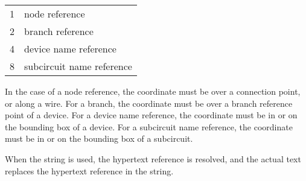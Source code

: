 \begin{description}
\begin{tabular}{ll}
1 & node reference\\
2 & branch reference\\
4 & device name reference\\
8 & subcircuit name reference\\
\end{tabular}

In the case of a node reference, the coordinate must be over a
connection point, or along a wire.  For a branch, the coordinate must
be over a branch reference point of a device.  For a device name
reference, the coordinate must be in or on the bounding box of a
device.  For a subcircuit name reference, the coordinate must be in or
on the bounding box of a subcircuit.

When the string is used, the hypertext reference is resolved, and
the actual text replaces the hypertext reference in the string.
\end{description}

